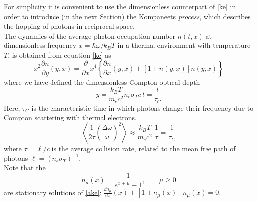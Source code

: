 \documentclass[a4paper,12pt,reqno,superscriptaddress,nofootinbib]{revtex4}
\newcommand{\0}{^{(0)}}
\newcommand{\1}{^{(1)}}
\newcommand{\2}{^{(2)}}
\begin{document}
For simplicity it is convenient to use the dimensionless counterpart of \eqref{ke} in order to introduce (in the next Section) the Kompaneets {\it process}, which describes the hopping of photons in reciprocal space.\\ 
The dynamics of the average photon occupation number $n(t, x)$ at dimensionless frequency $x= \hbar \omega/k_B T$ in a thermal environment with temperature $T$, is obtained from equation \eqref{ke} as
\begin{equation}\label{ake}
x^2\frac{\partial n}{\partial y}(y,x) = \frac{\partial }{\partial x}x^4\left\{
\frac{\partial n}{\partial x}(y,x) + 
\left[1+n(y,x)\right]n(y,x)\right\}
\end{equation}
where we have defined the dimensionless Compton optical depth
\[y = \frac{ k_B T }{m_e c^2} n_e \sigma_T c \, t =  \frac{ t}{\tau_C}\]
Here, $\tau_C$ is the  characteristic time in which photons change their frequency due to Compton scattering with thermal electrons,
\begin{equation}\label{shift}
\left\langle\frac{1}{2\tau}\left(\frac{\Delta\omega}{\omega}\right)^2\right\rangle\approx \frac{ k_B T }{m_e c^2}\; \frac 1{\tau}= \frac{1}{\tau_C}
\end{equation}
where $\tau = \ell/c$ is the average collision rate, related 
to the mean free path of photons $\ell=(n_e\sigma_T)^{-1}$.\\
Note that the
\begin{equation}\label{cc}
n_\mu(x) = \frac 1{e^{x+\mu}-1}, \qquad \mu\geq 0
\end{equation}
are stationary solutions of \eqref{ake}: $\frac{\dd n_\mu}{\dd x}(x) + [ 
1+n_\mu(x) ] \,n_\mu(x)=0$.\\
\end{document}
